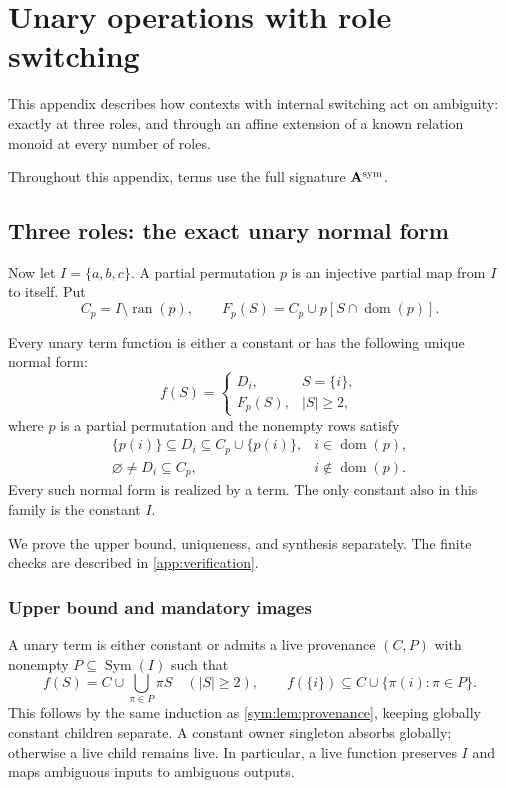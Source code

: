 \section{Unary operations with role switching}\label{app:ambiguity}
This appendix describes how contexts with internal switching act on ambiguity: exactly at three roles, and through an affine
extension of a known relation monoid at every number of roles.

Throughout this appendix, terms use the full signature
$\mathbf A^{\rm sym}$.

\subsection{Three roles: the exact unary normal form}

Now let $I=\{a,b,c\}$. A partial permutation $p$ is an injective partial
map from $I$ to itself. Put
\[
 C_p=I\setminus\operatorname{ran}(p),\qquad
 F_p(S)=C_p\cup p[S\cap\operatorname{dom}(p)].
\]

\begin{theorem}\label{sym:thm:unary}
Every unary term function is either a constant or has the following
unique normal form:
\begin{equation}\label{sym:eq:unary}
 f(S)=\begin{cases}D_i,&S=\{i\},\\F_p(S),&|S|\geq2,\end{cases}
\end{equation}
where $p$ is a partial permutation and the nonempty rows satisfy
\[
 \begin{array}{ll}
 \{p(i)\}\subseteq D_i\subseteq C_p\cup\{p(i)\},
       &i\in\operatorname{dom}(p),\\
 \varnothing\ne D_i\subseteq C_p,
       &i\notin\operatorname{dom}(p).
 \end{array}
\]
Every such normal form is realized by a term. The only constant also
in this family is the constant $I$.
\end{theorem}

We prove the upper bound, uniqueness, and synthesis separately. The finite checks are described in \cref{app:verification}.

\subsubsection{Upper bound and mandatory images}

A unary term is either constant or admits a live provenance
$(C,P)$ with nonempty $P\subseteq\operatorname{Sym}(I)$ such that
\[
 f(S)=C\cup\bigcup_{\pi\in P}\pi S\quad(|S|\geq2),\qquad
 f(\{i\})\subseteq C\cup\{\pi(i):\pi\in P\}.
\]
This follows by the same induction as \cref{sym:lem:provenance}, keeping
globally constant children separate. A constant owner singleton absorbs
globally; otherwise a live child remains live. In particular, a live
function preserves $I$ and maps ambiguous inputs to ambiguous outputs.


